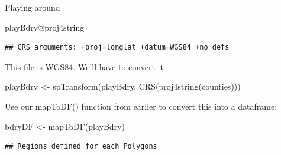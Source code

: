 \documentclass[
  ignorenonframetext,
]{beamer}
\newenvironment{Shaded}{\begin{snugshade}}{\end{snugshade}}
\newcommand{\FunctionTok}[1]{\textcolor[rgb]{0.00,0.00,0.00}{#1}}
\newcommand{\NormalTok}[1]{#1}
\newcommand{\OtherTok}[1]{\textcolor[rgb]{0.56,0.35,0.01}{#1}}
\newcommand{\SpecialCharTok}[1]{\textcolor[rgb]{0.00,0.00,0.00}{#1}}
\begin{document}
\begin{frame}[fragile]{Playing around}
\begin{Shaded}
\begin{Highlighting}[]
\NormalTok{playBdry}\SpecialCharTok{@}\NormalTok{proj4string}
\end{Highlighting}
\end{Shaded}

\begin{verbatim}
## CRS arguments: +proj=longlat +datum=WGS84 +no_defs
\end{verbatim}

\normalsize

This file is WGS84. We'll have to convert it: \tiny

\begin{Shaded}
\begin{Highlighting}[]
\NormalTok{playBdry }\OtherTok{\textless{}{-}} \FunctionTok{spTransform}\NormalTok{(playBdry, }\FunctionTok{CRS}\NormalTok{(}\FunctionTok{proj4string}\NormalTok{(counties)))}
\end{Highlighting}
\end{Shaded}

\normalsize

Use our mapToDF() function from earlier to convert this into a
dataframe:

\tiny

\begin{Shaded}
\begin{Highlighting}[]
\NormalTok{bdryDF }\OtherTok{\textless{}{-}} \FunctionTok{mapToDF}\NormalTok{(playBdry)}
\end{Highlighting}
\end{Shaded}

\begin{verbatim}
## Regions defined for each Polygons
\end{verbatim}
\end{frame}
\end{document}
